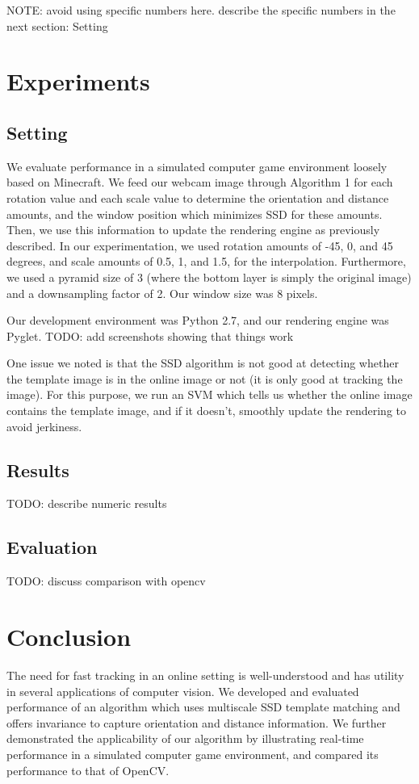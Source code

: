 \documentclass[10pt,twocolumn,letterpaper]{article}
\begin{document}
NOTE: avoid using specific numbers here. describe the specific numbers in
the next section: Setting

\section{Experiments}

\subsection*{Setting}
We evaluate performance in a simulated computer game environment loosely based
on Minecraft. We feed our webcam image through Algorithm 1 for each rotation
value and each scale value to determine the orientation and distance amounts,
and the window position which minimizes SSD for these amounts. Then, we use this
information to update the rendering engine as previously described. In our experimentation,
we used rotation amounts of -45, 0, and 45 degrees, and scale amounts of 0.5, 1, and 1.5,
for the interpolation. Furthermore, we used a pyramid size of 3 (where the bottom
layer is simply the original image) and a downsampling factor of 2. Our window size
was 8 pixels.

Our development environment was Python 2.7, and our rendering engine was Pyglet.
TODO: add screenshots showing that things work

One issue we noted is that the SSD algorithm is not good at detecting whether the template
image is in the online image or not (it is only good at tracking the image). For this
purpose, we run an SVM which tells us whether the online image contains the template image,
and if it doesn't, smoothly update the rendering to avoid jerkiness.

\subsection*{Results}
TODO: describe numeric results

\subsection*{Evaluation}
TODO: discuss comparison with opencv

\section{Conclusion}
The need for fast tracking in an online setting is well-understood and has utility
in several applications of computer vision. We developed and evaluated performance
of an algorithm which uses multiscale SSD template matching and offers invariance to
capture orientation and distance information. We further demonstrated the applicability of our
algorithm by illustrating real-time performance in a simulated computer game environment,
and compared its performance to that of OpenCV.

{\small


}
\end{document}
